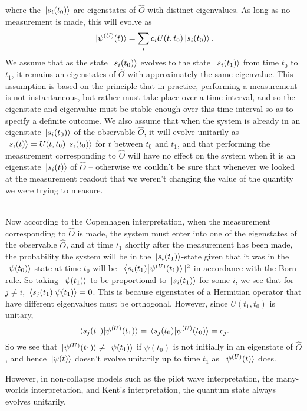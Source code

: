 { where the $\ket*{s_i(t_0)}$ are eigenstates of $\hat{O}$ with distinct eigenvalues. As long as no measurement is made, this will evolve as 
 $$\ket*{\psi^{(U)}(t)}=\sum_i c_iU(t,t_0)\ket*{s_i(t_0)}.$$  
 We assume that as the state $\ket*{s_i(t_0)}$ evolves to the state $\ket*{s_i(t_1)}$ from time $t_0$ to $t_1$, it remains an eigenstates of $\hat{O}$ with approximately the same eigenvalue. This assumption is based on the principle that in practice, performing a measurement is not instantaneous, but rather must take place over a time interval, and so the eigenstate and eigenvalue must be stable enough over this time interval so as to specify a definite outcome. We also assume that when the system is already in an eigenstate $\ket*{s_i(t_0)}$ of the observable $\hat{O}$, it will evolve unitarily as $\ket*{s_i(t)}=U(t,t_0)\ket*{s_i(t_0)}$ for $t$ between $t_0$ and $t_1$, and that performing the measurement corresponding to $\hat{O}$ will have no effect on the system when it is an eigenstate  $\ket*{s_i(t)}$ of $\hat{O}$ -- otherwise we couldn't be sure that whenever we looked at the measurement readout that we weren't changing the value of the quantity we were trying to measure. \strut \\[\baselineskip]
Now according to the Copenhagen interpretation, when the measurement corresponding to $\hat{O}$ is made, the system must enter into one of the eigenstates of the observable $\hat{O}$, and at time $t_1$ shortly after the measurement has been made, the probability the system will be in the $\ket*{s_i(t_1)}$-state given that it was in the $\ket*{\psi(t_0)}$-state at time $t_0$ will be $|\ip{s_i(t_1)}{\psi^{(U)}(t_1)}|^2$ in accordance with the Born rule. So taking $\ket*{\psi(t_1)}$ to be proportional to $\ket*{s_i(t_1)}$ for some $i$, we see that for $j\neq i$, $\ip*{s_j(t_1)}{\psi(t_1)}=0$. This is because eigenstates of a Hermitian operator that have different eigenvalues must be orthogonal. However, since $U(t_1,t_0)$ is unitary,
 $$\ip*{s_j(t_1)}{\psi^{(U)}(t_1)}=\ip*{s_j(t_0)}{\psi^{(U)}(t_0)}=c_j.$$
 So we see that $\ket*{\psi^{(U)}(t_1)}\neq\ket*{\psi(t_1)}$ if $\psi(t_0)$ is not initially in an eigenstate of $\hat{O}$, and hence $\ket*{\psi(t)}$ doesn't evolve unitarily up to time $t_1$ as $\ket*{\psi^{(U)}(t)}$ does.} However, in non-collapse models  such as the pilot wave interpretation, the many-worlds interpretation, and Kent's interpretation, the quantum state always evolves unitarily. 

